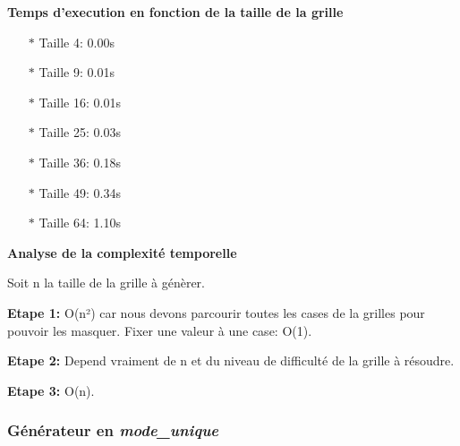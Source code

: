\documentclass{article}
\begin{document}
\begin{enumerate}
\textbf{Temps d'execution en fonction de la taille de la grille}
\vspace{0.2cm}

\begin{itemize}
    \item[$\ast$] Taille 4: 0.00s \vspace{0.12cm}
    \item[$\ast$] Taille 9: 0.01s \vspace{0.12cm}
    \item[$\ast$] Taille 16: 0.01s \vspace{0.12cm}
    \item[$\ast$] Taille 25: 0.03s \vspace{0.12cm}
    \item[$\ast$] Taille 36: 0.18s \vspace{0.12cm}
    \item[$\ast$] Taille 49: 0.34s \vspace{0.12cm}
    \item[$\ast$] Taille 64: 1.10s \vspace{0.12cm}
\end{itemize}
 \vspace{1cm}
 
\textbf{Analyse de la complexité temporelle}\vspace{0.13cm}

 
Soit n la taille de la grille à génèrer.
\vspace{0.18cm}

\textbf{Etape 1:} O(n²) car nous devons parcourir toutes les cases de la grilles pour pouvoir les masquer. Fixer une valeur à une case: O(1).\vspace{0.15cm}

\textbf{Etape 2:} Depend vraiment de n et du niveau de difficulté de la grille à résoudre.\vspace{0.15cm}

\textbf{Etape 3:} O(n).\vspace{0.15cm}
  
\subsubsection{ Générateur en \textit{mode\_unique} }


\end{enumerate}
\end{document}
